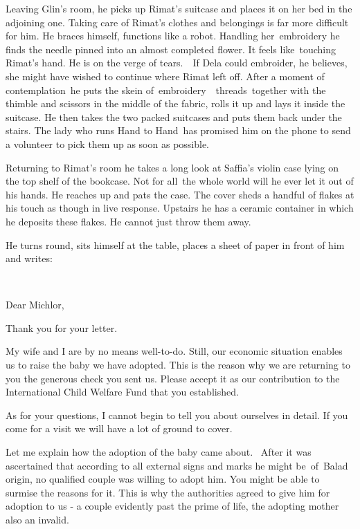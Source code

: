 \documentclass[twoside,11pt]{book}
\begin{document}
Leaving Glin's room, he picks up Rimat's suitcase and places it on her bed in the adjoining one. Taking care of Rimat's
clothes and belongings is far more difficult for him. He braces himself, functions like a robot. Handling
her\ embroidery he finds the needle pinned into an almost completed flower. It feels like~touching Rimat's hand. He is
on the verge of tears{.}\ \ If Dela could embroider, he believes, she might
have wished to continue where Rimat left off. After a moment of contemplation\ he puts the skein
of\ embroidery\ \ threads\ together with the thimble and scissors in the middle of the fabric, rolls it up and lays it
inside the suitcase. He then takes the two packed suitcases and puts them back under the stairs. The lady who runs
{\textquotedbl}Hand to Hand{\textquotedbl}~has promised him on the phone to send a volunteer to pick them up as soon as
possible. 

Returning to Rimat's room he takes a long look at Saffia's violin case lying on the top shelf of the bookcase. Not for
all{\ }the whole world will he ever let it out of his hands. He reaches up and
pats the case. The cover sheds a handful of flakes at his touch as though in live response. Upstairs he has a ceramic
container in which he deposits these flakes. He cannot just throw them away.

He turns round, sits himself at the table, places a sheet of paper in front of him and writes:

~

Dear Michlor,

Thank you for your letter. 

My wife and I are by no means well-to-do. Still, our economic situation enables us to raise the baby we have adopted.
This is the reason why we are returning to you the generous check you sent us. Please accept it as our contribution to
the International Child Welfare Fund that you established.

As for your questions, I cannot begin to tell you about ourselves in detail. If you come for a visit we will have a lot
of ground to cover.

Let me explain how the adoption of the baby came about. \ After it was ascertained that according to all external signs
and marks he might be~of~Balad origin, no qualified couple was willing to adopt him. You might be able to surmise the
reasons for it. This is why the authorities agreed to give him for adoption to us - a couple evidently past the prime
of life, the adopting mother also an invalid.\ 
\end{document}
